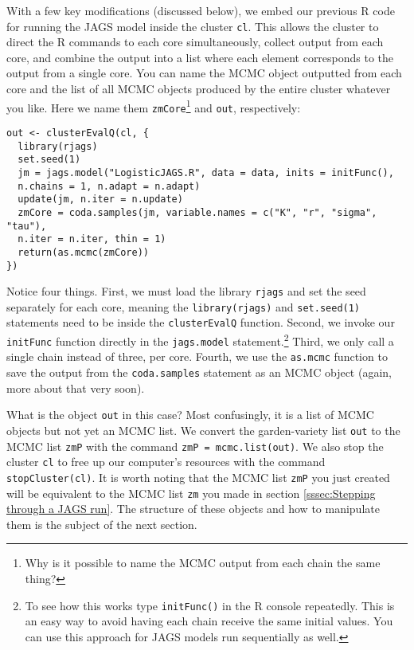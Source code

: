 \documentclass[12pt,english]{article}
\begin{document}
With a few key modifications (discussed below), we embed our previous R code for running the JAGS model inside the cluster \texttt{cl}. This allows the cluster to direct the R commands to each core simultaneously, collect output from each core, and combine the output into a list where each element corresponds to the output from a single core. You can name the MCMC object outputted from each core and the list of all MCMC objects produced by the entire cluster whatever you like. Here we name them \texttt{zmCore}\footnote{Why is it possible to name the MCMC output from each chain the same thing?} and \texttt{out}, respectively:

\begin{Verbatim}
out <- clusterEvalQ(cl, {
  library(rjags)
  set.seed(1)
  jm = jags.model("LogisticJAGS.R", data = data, inits = initFunc(), 
  n.chains = 1, n.adapt = n.adapt)
  update(jm, n.iter = n.update)
  zmCore = coda.samples(jm, variable.names = c("K", "r", "sigma", "tau"), 
  n.iter = n.iter, thin = 1)
  return(as.mcmc(zmCore))
}) 
\end{Verbatim}

\noindent Notice four things. First, we must load the library \texttt{rjags} and set the seed separately for each core, meaning the \texttt{library(rjags)} and \texttt{set.seed(1)} statements need to be inside the \texttt{clusterEvalQ} function. Second, we invoke our \texttt{initFunc} function directly in the \texttt{jags.model} statement.\footnote{To see how this works type \texttt{initFunc()} in the R console repeatedly. This is an easy way to avoid having each chain receive the same initial values. You can use this approach for JAGS models run sequentially as well.} Third, we only call a single chain instead of three, per core. Fourth, we use the \texttt{as.mcmc} function to save the output from the \texttt{coda.samples} statement as an MCMC object (again, more about that very soon).

What is the object \texttt{out} in this case? Most confusingly, it is a list of MCMC objects but not yet an MCMC list. We convert the garden-variety list \texttt{out} to the MCMC list \texttt{zmP} with the command \texttt{zmP = mcmc.list(out)}. We also stop the cluster \texttt{cl} to free up our computer's resources with the command \texttt{stopCluster(cl)}. It is worth noting that the MCMC list \texttt{zmP} you just created will be equivalent to the MCMC list \texttt{zm} you made in section \ref{sssec:Stepping through a JAGS run}. The structure of these objects and how to manipulate them is the subject of the next section.
\end{document}
